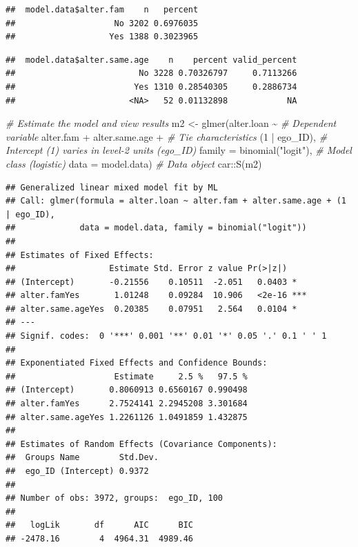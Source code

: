 \documentclass[
]{book}
\newenvironment{Shaded}{\begin{snugshade}}{\end{snugshade}}
\newcommand{\AttributeTok}[1]{\textcolor[rgb]{0.77,0.63,0.00}{#1}}
\newcommand{\CommentTok}[1]{\textcolor[rgb]{0.56,0.35,0.01}{\textit{#1}}}
\newcommand{\DecValTok}[1]{\textcolor[rgb]{0.00,0.00,0.81}{#1}}
\newcommand{\FunctionTok}[1]{\textcolor[rgb]{0.00,0.00,0.00}{#1}}
\newcommand{\NormalTok}[1]{#1}
\newcommand{\OtherTok}[1]{\textcolor[rgb]{0.56,0.35,0.01}{#1}}
\newcommand{\SpecialCharTok}[1]{\textcolor[rgb]{0.00,0.00,0.00}{#1}}
\newcommand{\StringTok}[1]{\textcolor[rgb]{0.31,0.60,0.02}{#1}}
\begin{document}
\begin{verbatim}
##  model.data$alter.fam    n   percent
##                    No 3202 0.6976035
##                   Yes 1388 0.3023965
\end{verbatim}

\begin{Shaded}
\end{Shaded}

\begin{verbatim}
##  model.data$alter.same.age    n    percent valid_percent
##                         No 3228 0.70326797     0.7113266
##                        Yes 1310 0.28540305     0.2886734
##                       <NA>   52 0.01132898            NA
\end{verbatim}

\begin{Shaded}
\begin{Highlighting}[]
\CommentTok{\# Estimate the model and view results}
\NormalTok{m2 }\OtherTok{\textless{}{-}} \FunctionTok{glmer}\NormalTok{(alter.loan }\SpecialCharTok{\textasciitilde{}} \CommentTok{\# Dependent variable}
\NormalTok{              alter.fam }\SpecialCharTok{+}\NormalTok{ alter.same.age }\SpecialCharTok{+} \CommentTok{\# Tie characteristics}
\NormalTok{              (}\DecValTok{1} \SpecialCharTok{|}\NormalTok{ ego\_ID), }\CommentTok{\# Intercept (1) varies in level{-}2 units (ego\_ID)}
            \AttributeTok{family =} \FunctionTok{binomial}\NormalTok{(}\StringTok{"logit"}\NormalTok{), }\CommentTok{\# Model class (logistic)}
            \AttributeTok{data =}\NormalTok{ model.data) }\CommentTok{\# Data object}
\NormalTok{car}\SpecialCharTok{::}\FunctionTok{S}\NormalTok{(m2)}
\end{Highlighting}
\end{Shaded}

\begin{verbatim}
## Generalized linear mixed model fit by ML
## Call: glmer(formula = alter.loan ~ alter.fam + alter.same.age + (1 | ego_ID),
##             data = model.data, family = binomial("logit"))
## 
## Estimates of Fixed Effects:
##                   Estimate Std. Error z value Pr(>|z|)    
## (Intercept)       -0.21556    0.10511  -2.051   0.0403 *  
## alter.famYes       1.01248    0.09284  10.906   <2e-16 ***
## alter.same.ageYes  0.20385    0.07951   2.564   0.0104 *  
## ---
## Signif. codes:  0 '***' 0.001 '**' 0.01 '*' 0.05 '.' 0.1 ' ' 1
## 
## Exponentiated Fixed Effects and Confidence Bounds:
##                    Estimate     2.5 %   97.5 %
## (Intercept)       0.8060913 0.6560167 0.990498
## alter.famYes      2.7524141 2.2945208 3.301684
## alter.same.ageYes 1.2261126 1.0491859 1.432875
## 
## Estimates of Random Effects (Covariance Components):
##  Groups Name        Std.Dev.
##  ego_ID (Intercept) 0.9372  
## 
## Number of obs: 3972, groups:  ego_ID, 100
## 
##   logLik       df      AIC      BIC 
## -2478.16        4  4964.31  4989.46
\end{verbatim}
\end{document}
